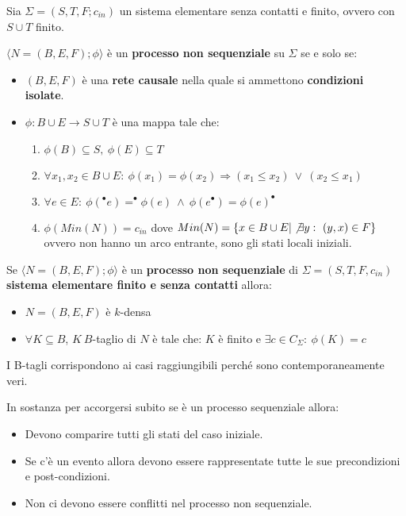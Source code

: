 \begin{definizione}
    Sia $\Sigma = (S, T, F; c_{in})$ un sistema elementare senza contatti e finito,
    ovvero con $S \cup T$ finito.

    $\langle N = (B, E, F); \phi \rangle$ è un \textbf{processo non sequenziale}
    su $\Sigma$ se e solo se:
    \begin{itemize}
        \item $(B, E, F)$ è una \textbf{rete causale} nella quale si ammettono \textbf{condizioni
                  isolate}.
        \item $\phi: B \cup E \to S \cup T$ è una mappa tale che:
              \begin{enumerate}
                  \item $\phi(B) \subseteq S, \ \phi(E) \subseteq T$
                  \item $\forall x_1, x_2 \in B \cup E: \ \phi(x_1) = \phi(x_2)
                            \Rightarrow (x_1 \leq x_2) \ \lor \ (x_2 \leq x_1)$
                  \item $\forall e \in E: \ \phi(^{\bullet}e) = ^{\bullet}\phi(e)
                            \ \land \ \phi(e^{\bullet}) = \phi(e)^{\bullet}$
                  \item $\phi(Min(N)) = c_{in}$ dove
                        $Min(N) = \{x \in B \cup E | \not\exists y: \ (y, x) \in F\}$
                        ovvero non hanno un arco entrante, sono gli stati locali
                        iniziali.
              \end{enumerate}
    \end{itemize}
\end{definizione}
Se $\langle N = (B, E, F); \phi \rangle$ è un \textbf{processo non sequenziale} di
$\Sigma = (S, T, F, c_{in})$ \textbf{sistema elementare finito e senza contatti} allora:
\begin{itemize}
    \item $N = (B, E, F)$ è $k$-densa
    \item $\forall K \subseteq B$, $K\ B$-taglio di $N$ è tale che: $K$ è finito e
          $\exists c \in C_{\Sigma}: \ \phi(K) = c$
\end{itemize}
I B-tagli corrispondono ai casi raggiungibili perché sono contemporaneamente veri.
\begin{nota}
    In sostanza per accorgersi subito se è un processo sequenziale allora:
    \begin{itemize}
        \item Devono comparire tutti gli stati del caso iniziale.
        \item Se c'è un evento allora devono essere rappresentate tutte le sue
              precondizioni e post-condizioni.
        \item Non ci devono essere conflitti nel processo non sequenziale.
    \end{itemize}
\end{nota}
